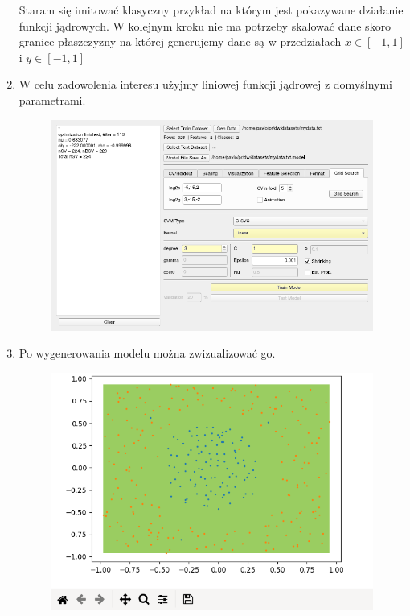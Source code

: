 \documentclass[paper=a4, fontsize=11pt]{scrartcl} %
\numberwithin{equation}{section} %
\numberwithin{figure}{section} %
\begin{document}
\begin{enumerate}[label={\textbf{Krok \theenumi :}},leftmargin=*]
    Staram się imitować klasyczny przykład na którym jest pokazywane działanie funkcji
    jądrowych. W kolejnym kroku nie ma potrzeby skalować dane skoro granice płaszczyzny na
    której generujemy dane są w przedziałach $x\in [-1, 1]$ i $y\in [-1, 1]$

    \item W celu zadowolenia interesu użyjmy liniowej funkcji jądrowej z domyślnymi
        parametrami.

    \begin{figure}[H]
        \begin{center}
            \includegraphics[scale=0.7]{./img/ex3_st3.png}
        \end{center}
    \end{figure}

    \newpage
    \item Po wygenerowania modelu można zwizualizować go.

    \begin{figure}[H]
        \begin{center}
            \includegraphics[scale=0.7]{./img/ex3_st4.png}
        \end{center}
    \end{figure}


\end{enumerate}
\end{document}
